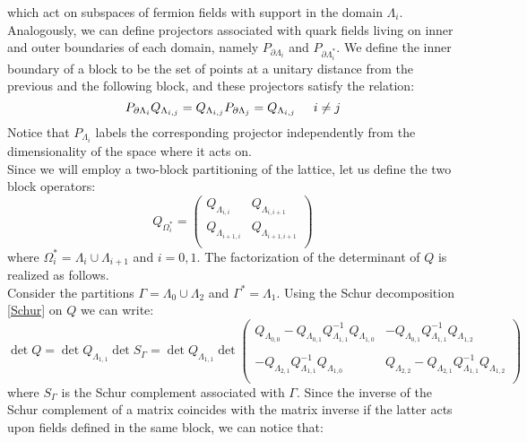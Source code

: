 which act on subspaces of fermion fields with support in the domain $\Lambda_i$. \\ Analogously, we can define projectors associated with quark fields living on inner and outer boundaries of each domain, namely $P_{\partial \Lambda_i}$ and $P_{\partial \Lambda_i^*}$. We define the inner boundary of a block to be the set of points at a unitary distance from the previous and the following block, and these projectors satisfy the relation:
\begin{equation}
    P_{\partial \Lambda_i} Q_{\Lambda_{i, j}} = Q_{\Lambda_{i, j}} P_{\partial \Lambda_j} = Q_{\Lambda_{i,j}} \hspace{5mm} i \neq j
\end{equation}
Notice that $P_{\Lambda_i}$ labels the corresponding projector independently from the dimensionality of the space where it acts on.
\\ Since we will employ a two-block partitioning of the lattice, let us define the two block operators:
\begin{equation}
    Q_{\Omega_i^*} = \begin{pmatrix}
 Q_{\Lambda_{i,i}} & Q_{\Lambda_{i,i+1}} \\
   Q_{\Lambda_{i+1,i}} & Q_{\Lambda_{i+1,i+1}} \\
\end{pmatrix}
\end{equation}
where $\Omega_i^* = \Lambda_i \cup \Lambda_{i+1}$ and $i = 0, 1$. The factorization of the determinant of $Q$ is realized as follows.
\\ Consider the partitions $\Gamma = \Lambda_0 \cup \Lambda_2$ and $\Gamma^* = \Lambda_1$. Using the Schur decomposition \eqref{Schur} on $Q$ we can write:
\begin{equation}\label{det Q}
    \det Q = \det Q_{\Lambda_{1,1}} \det S_{\Gamma} = \det Q_{\Lambda_{1,1}} \det \begin{pmatrix}
        Q_{\Lambda_{0,0}} - Q_{\Lambda_{0,1}}Q^{-1}_{\Lambda_{1,1}}Q_{\Lambda_{1,0}} & - Q_{\Lambda_{0,1}}Q^{-1}_{\Lambda_{1,1}}Q_{\Lambda_{1,2}} \\
        \\
        - Q_{\Lambda_{2,1}}Q^{-1}_{\Lambda_{1,1}}Q_{\Lambda_{1,0}} & Q_{\Lambda_{2,2}} - Q_{\Lambda_{2,1}}Q^{-1}_{\Lambda_{1,1}}Q_{\Lambda_{1,2}} \\ 
    \end{pmatrix}
\end{equation}
where $S_\Gamma$ is the Schur complement associated with $\Gamma.$ Since the inverse of the Schur complement of a matrix coincides with the matrix inverse if the latter acts upon fields defined in the same block, we can notice that:
